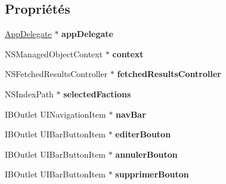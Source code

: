 \subsection*{Propriétés}
\begin{DoxyCompactItemize}
\item 
\hypertarget{interface_historique_table_view_controller_a16f80354df3a64d68c554af188e1dd89}{}\hyperlink{interface_app_delegate}{App\+Delegate} $\ast$ {\bfseries app\+Delegate}\label{interface_historique_table_view_controller_a16f80354df3a64d68c554af188e1dd89}

\item 
\hypertarget{interface_historique_table_view_controller_a113379059c77782ba15eeaddc9c21071}{}N\+S\+Managed\+Object\+Context $\ast$ {\bfseries context}\label{interface_historique_table_view_controller_a113379059c77782ba15eeaddc9c21071}

\item 
\hypertarget{interface_historique_table_view_controller_aaf2bb044922c4831996403ea7439f11c}{}N\+S\+Fetched\+Results\+Controller $\ast$ {\bfseries fetched\+Results\+Controller}\label{interface_historique_table_view_controller_aaf2bb044922c4831996403ea7439f11c}

\item 
\hypertarget{interface_historique_table_view_controller_acb93d60dbfe41c03b65b7671f1add565}{}N\+S\+Index\+Path $\ast$ {\bfseries selected\+Factions}\label{interface_historique_table_view_controller_acb93d60dbfe41c03b65b7671f1add565}

\item 
\hypertarget{interface_historique_table_view_controller_ae6806cd2de6d4de79a40b4715f1cc7ae}{}I\+B\+Outlet U\+I\+Navigation\+Item $\ast$ {\bfseries nav\+Bar}\label{interface_historique_table_view_controller_ae6806cd2de6d4de79a40b4715f1cc7ae}

\item 
\hypertarget{interface_historique_table_view_controller_a82ed4352eb658b6dc9108c3d74c8599f}{}I\+B\+Outlet U\+I\+Bar\+Button\+Item $\ast$ {\bfseries editer\+Bouton}\label{interface_historique_table_view_controller_a82ed4352eb658b6dc9108c3d74c8599f}

\item 
\hypertarget{interface_historique_table_view_controller_af4d3961b8c494b554a27263d35739339}{}I\+B\+Outlet U\+I\+Bar\+Button\+Item $\ast$ {\bfseries annuler\+Bouton}\label{interface_historique_table_view_controller_af4d3961b8c494b554a27263d35739339}

\item 
\hypertarget{interface_historique_table_view_controller_a1ce6883d0ab59a1021948d258151c52d}{}I\+B\+Outlet U\+I\+Bar\+Button\+Item $\ast$ {\bfseries supprimer\+Bouton}\label{interface_historique_table_view_controller_a1ce6883d0ab59a1021948d258151c52d}

\end{DoxyCompactItemize}


